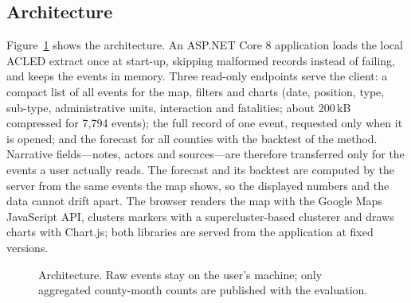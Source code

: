 \documentclass[11pt,a4paper]{article}
\begin{document}
\subsection{Architecture}

Figure~\ref{fig:arch} shows the architecture. An ASP.NET Core 8 application loads the local ACLED extract once at start-up, skipping malformed records instead of failing, and keeps the events in memory. Three read-only endpoints serve the client: a compact list of all events for the map, filters and charts (date, position, type, sub-type, administrative units, interaction and fatalities; about 200\,kB compressed for 7{,}794 events); the full record of one event, requested only when it is opened; and the forecast for all counties with the backtest of the method. Narrative fields---notes, actors and sources---are therefore transferred only for the events a user actually reads. The forecast and its backtest are computed by the server from the same events the map shows, so the displayed numbers and the data cannot drift apart. The browser renders the map with the Google Maps JavaScript API, clusters markers with a supercluster-based clusterer and draws charts with Chart.js; both libraries are served from the application at fixed versions.

\begin{figure}[htbp]
\centering
{}
\caption{Architecture. Raw events stay on the user's machine; only aggregated county-month counts are published with the evaluation.}
\label{fig:arch}
\end{figure}
\end{document}
